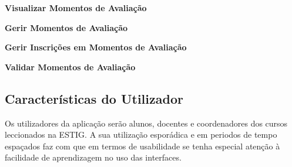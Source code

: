 \begin{list}{-}{}
\item \textbf{Visualizar Momentos de Avaliação}
\item \textbf{Gerir Momentos de Avaliação}
\item \textbf{Gerir Inscrições em Momentos de Avaliação}
\item \textbf{Validar Momentos de Avaliação}
\end{list}

\subsection{Características do Utilizador}
Os utilizadores da aplicação serão alunos, docentes e coordenadores dos cursos leccionados na ESTIG. A sua utilização esporádica e em periodos de tempo espaçados faz com que em termos de usabilidade se tenha especial atenção à facilidade de aprendizagem no uso das interfaces.


